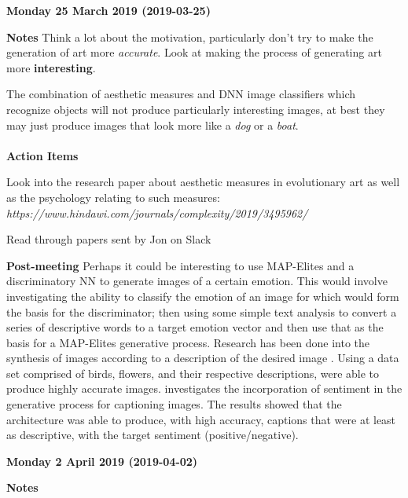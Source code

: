 \documentclass[10pt,a4paper]{article}
\begin{document}
	\begin{center} \textbf{Monday 25 March 2019 (2019-03-25)} \end{center} 
	
	\textbf{Notes}
	Think a lot about the motivation, particularly don't try to make the generation of art more \textit{accurate}. Look at making the process of generating art more \textbf{interesting}.
	
	The combination of aesthetic measures and DNN image classifiers which recognize objects will not produce particularly interesting images, at best they may just produce images that look more like a \textit{dog} or a \textit{boat}.
	\\\\
	\textbf{Action Items}
	\begin{todolist}
		\item Look into the research paper about aesthetic measures in evolutionary art as well as the psychology relating to such measures:\\
		\textit{https://www.hindawi.com/journals/complexity/2019/3495962/}
		\item Read through papers sent by Jon on Slack
	\end{todolist}
	\textbf{Post-meeting}
	Perhaps it could be interesting to use MAP-Elites and a discriminatory NN to generate images of a certain emotion. This would involve investigating the ability to classify the emotion of an image for which would form the basis for the discriminator; then using some simple text analysis to convert a series of descriptive words to a target emotion vector and then use that as the basis for a MAP-Elites generative process.
	Research has been done into the synthesis of images according to a description of the desired image \citep{reed2016generative}.
	Using a data set comprised of birds, flowers, and their respective descriptions, \citet{reed2016generative} were able to produce highly accurate images.
	\citet{mathews2016senticap} investigates the incorporation of sentiment in the generative process for captioning images.
	The results showed that the architecture was able to produce, with high accuracy, captions that were at least as descriptive, with the target sentiment (positive/negative).
	
	\begin{center} \textbf{Monday 2 April 2019 (2019-04-02)} \end{center} 
	
	\textbf{Notes}
	
\end{document}
